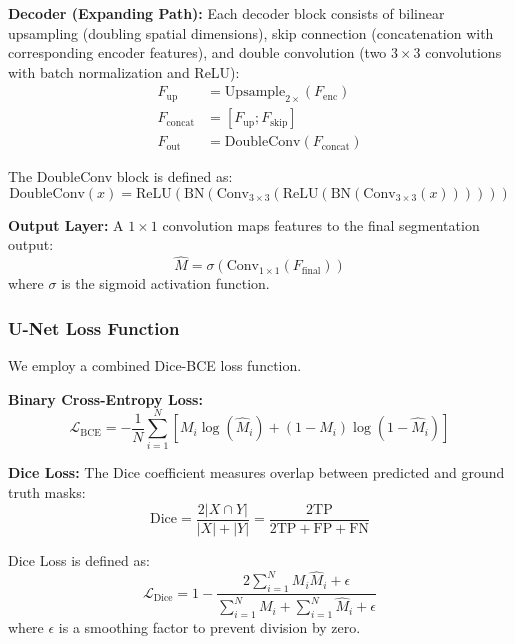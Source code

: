 \documentclass[conference]{IEEEtran}
\begin{document}
\textbf{Decoder (Expanding Path):} Each decoder block consists of bilinear upsampling (doubling spatial dimensions), skip connection (concatenation with corresponding encoder features), and double convolution (two $3\times3$ convolutions with batch normalization and ReLU):
\begin{align}
    F_{\text{up}} &= \text{Upsample}_{2\times}(F_{\text{enc}}) \\
    F_{\text{concat}} &= [F_{\text{up}}; F_{\text{skip}}] \\
    F_{\text{out}} &= \text{DoubleConv}(F_{\text{concat}})
\end{align}

The DoubleConv block is defined as:
\begin{equation}
    \text{DoubleConv}(x) = \text{ReLU}(\text{BN}(\text{Conv}_{3\times3}(\text{ReLU}(\text{BN}(\text{Conv}_{3\times3}(x))))))
\end{equation}

\textbf{Output Layer:} A $1\times1$ convolution maps features to the final segmentation output:
\begin{equation}
    \hat{M} = \sigma(\text{Conv}_{1\times1}(F_{\text{final}}))
\end{equation}
where $\sigma$ is the sigmoid activation function.

\subsubsection{U-Net Loss Function}
We employ a combined Dice-BCE loss function.

\textbf{Binary Cross-Entropy Loss:}
\begin{equation}
    \mathcal{L}_{\text{BCE}} = -\frac{1}{N}\sum_{i=1}^{N}\left[M_i \log(\hat{M}_i) + (1-M_i)\log(1-\hat{M}_i)\right]
\end{equation}

\textbf{Dice Loss:} The Dice coefficient measures overlap between predicted and ground truth masks:
\begin{equation}
    \text{Dice} = \frac{2|X \cap Y|}{|X| + |Y|} = \frac{2\text{TP}}{2\text{TP} + \text{FP} + \text{FN}}
\end{equation}

Dice Loss is defined as:
\begin{equation}
    \mathcal{L}_{\text{Dice}} = 1 - \frac{2\sum_{i=1}^{N}M_i \hat{M}_i + \epsilon}{\sum_{i=1}^{N}M_i + \sum_{i=1}^{N}\hat{M}_i + \epsilon}
\end{equation}
where $\epsilon$ is a smoothing factor to prevent division by zero.
\end{document}
